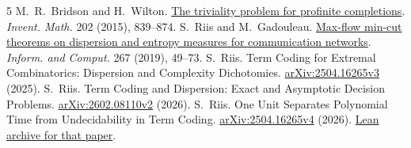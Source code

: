 \documentclass[a4paper,11pt]{article}
\begin{document}
\begingroup\small
\begin{thebibliography}{5}
\setlength{\itemsep}{2pt}
 M.~R.~Bridson and H.~Wilton.
\href{https://doi.org/10.1007/s00222-015-0578-8}{The triviality problem for profinite completions}.
\emph{Invent. Math.} 202 (2015), 839--874.
 S.~Riis and M.~Gadouleau.
\href{https://doi.org/10.1016/j.ic.2019.03.004}{Max-flow min-cut theorems on dispersion and entropy measures for communication networks}.
\emph{Inform. and Comput.} 267 (2019), 49--73.
 S.~Riis. Term Coding for Extremal Combinatorics: Dispersion and Complexity Dichotomies.
\href{https://arxiv.org/abs/2504.16265v3}{arXiv:2504.16265v3} (2025).
 S.~Riis. Term Coding and Dispersion: Exact and Asymptotic Decision Problems.
\href{https://arxiv.org/abs/2602.08110v2}{arXiv:2602.08110v2} (2026).
 S.~Riis. One Unit Separates Polynomial Time from Undecidability in Term Coding.
\href{https://arxiv.org/abs/2504.16265v4}{arXiv:2504.16265v4} (2026). \href{https://doi.org/10.5281/zenodo.22727895}{Lean archive for that paper}.
\end{thebibliography}
\endgroup
\end{document}
